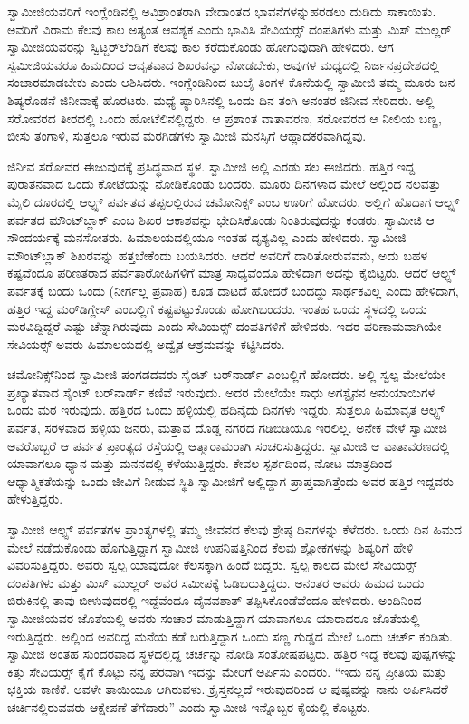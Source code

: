  ಸ್ವಾಮೀಜಿಯವರಿಗೆ ಇಂಗ್ಲೆಂಡಿನಲ್ಲಿ ಅವಿಶ್ರಾಂತರಾಗಿ ವೇದಾಂತದ ಭಾವನೆಗಳನ್ನು\break ಹರಡಲು ದುಡಿದು ಸಾಕಾಯಿತು. ಅವರಿಗೆ ವಿರಾಮ ಕೆಲವು ಕಾಲ ಅತ್ಯಂತ ಆವಶ್ಯಕ ಎಂದು ಭಾವಿಸಿ ಸೇವಿಯರ್ಸ್‍‍ ದಂಪತಿಗಳು ಮತ್ತು ಮಿಸ್ ಮುಲ್ಲರ್ ಸ್ವಾಮೀಜಿಯವರನ್ನು ಸ್ವಿಟ್ಜರ್‌ಲೆಂಡಿಗೆ ಕೆಲವು ಕಾಲ ಕರೆದುಕೊಂಡು ಹೋಗುವುದಾಗಿ ಹೇಳಿದರು. ಆಗ ಸ್ವಮೀಜಿಯವರೂ ಹಿಮದಿಂದ ಆವೃತವಾದ ಶಿಖರವನ್ನು ನೋಡಬೇಕು, ಅವುಗಳ ಮಧ್ಯದಲ್ಲಿ ನಿರ್ಜನಪ್ರದೇಶದಲ್ಲಿ ಸಂಚಾರಮಾಡಬೇಕು ಎಂದು ಆಶಿಸಿದರು. ಇಂಗ್ಲೆಂಡಿನಿಂದ ಜುಲೈ ತಿಂಗಳ ಕೊನೆಯಲ್ಲಿ ಸ್ವಾಮೀಜಿ ತಮ್ಮ ಮೂರು ಜನ ಶಿಷ್ಯರೊಡನೆ ಜಿನೀವಾಕ್ಕೆ ಹೊರಟರು. ಮಧ್ಯೆ ಪ್ಯಾರಿಸಿನಲ್ಲಿ ಒಂದು ದಿನ ತಂಗಿ ಅನಂತರ ಜಿನೀವ ಸೇರಿದರು. ಅಲ್ಲಿ ಸರೋವರದ ತೀರದಲ್ಲಿ ಒಂದು ಹೋಟೆಲಿನಲ್ಲಿದ್ದರು. ಆ ಪ್ರಶಾಂತ ವಾತಾವರಣ, ಸರೋವರದ ಆ ನೀಲಿಯ ಬಣ್ಣ, ಬೀಸು ತಂಗಾಳಿ, ಸುತ್ತಲೂ ಇರುವ ಮರಗಿಡಗಳು ಸ್ವಾಮೀಜಿ ಮನಸ್ಸಿಗೆ ಆಹ್ಲಾದಕರವಾಗಿದ್ದವು. 

 ಜಿನೀವ ಸರೋವರ ಈಜುವುದಕ್ಕೆ ಪ್ರಸಿದ್ಧವಾದ ಸ್ಥಳ. ಸ್ವಾಮೀಜಿ ಅಲ್ಲಿ ಎರಡು ಸಲ ಈಜಿದರು. ಹತ್ತಿರ ಇದ್ದ ಪುರಾತನವಾದ ಒಂದು ಕೋಟೆಯನ್ನು ನೋಡಿಕೊಂಡು ಬಂದರು. ಮೂರು ದಿನಗಳಾದ ಮೇಲೆ ಅಲ್ಲಿಂದ ನಲವತ್ತು ಮೈಲಿ ದೂರದಲ್ಲಿ ಆಲ್ಫ್ಸ್ ಪರ್ವತದ ತಪ್ಪಲಲ್ಲಿರುವ ಚಮೋನಿಕ್ಸ್ ಎಂಬ ಊರಿಗೆ ಹೋದರು. ಅಲ್ಲಿಗೆ ಹೊದಾಗ ಆಲ್ಫ್ಸ್ ಪರ್ವತದ ಮೌಂಟ್‍ಬ್ಲಾಕ್ ಎಂಬ ಶಿಖರ ಆಕಾಶವನ್ನು ಭೇದಿಸಿಕೊಂಡು ನಿಂತಿರುವುದನ್ನು ಕಂಡರು. ಸ್ವಾಮೀಜಿ ಆ ಸೌಂದರ್ಯಕ್ಕೆ ಮನಸೋತರು. ಹಿಮಾಲಯದಲ್ಲಿಯೂ ಇಂತಹ ದೃಶ್ಯವಿಲ್ಲ ಎಂದು ಹೇಳಿದರು. ಸ್ವಾಮೀಜಿ ಮೌಂಟ್‍ಬ್ಲಾಕ್ ಶಿಖರವನ್ನು ಹತ್ತಬೇಕೆಂದು ಬಯಸಿದರು. ಆದರೆ ಅವರಿಗೆ ದಾರಿತೋರುವವನು, ಅದು ಬಹಳ ಕಷ್ಟವೆಂದೂ ಪರಿಣತರಾದ ಪರ್ವತಾರೋಹಿಗಳಿಗೆ ಮಾತ್ರ ಸಾಧ್ಯವೆಂದೂ ಹೇಳಿದಾಗ ಅದನ್ನು ಕೈಬಿಟ್ಟರು. ಆದರೆ ಆಲ್ಫ್ಸ್ ಪರ್ವತಕ್ಕೆ ಬಂದು ಒಂದು (ನೀರ್ಗಲ್ಲ ಪ್ರವಾಹ) ಕೂಡ ದಾಟದೆ ಹೋದರೆ ಬಂದದ್ದು ಸಾರ್ಥಕವಿಲ್ಲ ಎಂದು ಹೇಳಿದಾಗ, ಹತ್ತಿರ ಇದ್ದ ಮರ್‌ಡಿಗ್ಲೇಸ್ ಎಂಬಲ್ಲಿಗೆ ಕಷ್ಟಪಟ್ಟುಕೊಂಡು ಹೋಗಿಬಂದರು. ಇಂತಹ ಒಂದು ಸ್ಥಳದಲ್ಲಿ ಒಂದು ಮಠವಿದ್ದಿದ್ದರೆ ಎಷ್ಟು ಚೆನ್ನಾಗಿರುವುದು ಎಂದು ಸೇವಿಯರ್ಸ್‍‍ ದಂಪತಿಗಳಿಗೆ ಹೇಳಿದರು. ಇದರ ಪರಿಣಾಮವಾಗಿಯೇ ಸೇವಿಯರ್ಸ್‍‍ ಅವರು ಹಿಮಾಲಯದಲ್ಲಿ ಅದ್ವೈತ ಆಶ್ರಮವನ್ನು ಕಟ್ಟಿಸಿದರು. 

 ಚಮೋನಿಕ್ಸ್‌ನಿಂದ ಸ್ವಾಮೀಜಿ ಪಂಗಡದವರು ಸೈಂಟ್ ಬರ್‌ನಾರ್ಡ್ ಎಂಬಲ್ಲಿಗೆ ಹೋದರು. ಅಲ್ಲಿ ಸ್ವಲ್ಪ ಮೇಲೆಯೇ ಪ್ರಖ್ಯಾತವಾದ ಸೈಂಟ್ ಬರ್‌ನಾರ್ಡ್ ಕಣಿವೆ ಇರುವುದು. ಅದರ ಮೇಲೆಯೇ ಸಾಧು ಅಗಸ್ಟೈನನ ಅನುಯಾಯಿಗಳ ಒಂದು ಮಠ ಇರುವುದು. ಹತ್ತಿರದ ಒಂದು ಹಳ್ಳಿಯಲ್ಲಿ ಹದಿನೈದು ದಿನಗಳು ಇದ್ದರು. ಸುತ್ತಲೂ ಹಿಮಾವೃತ ಆಲ್ಫ್ಸ್ ಪರ್ವತ, ಸರಳವಾದ ಹಳ್ಳಿಯ ಜನರು, ಮತ್ತಾವ ದೊಡ್ಡ ನಗರದ ಗಡಿಬಿಡಿಯೂ ಇರಲಿಲ್ಲ. ಅನೇಕ ವೇಳೆ ಸ್ವಾಮೀಜಿ ಅವರೊಬ್ಬರೆ ಆ ಪರ್ವತ ಪ್ರಾಂತ್ಯದ ರಸ್ತೆಯಲ್ಲಿ ಆತ್ಮಾರಾಮರಾಗಿ ಸಂಚರಿಸುತ್ತಿದ್ದರು. ಸ್ವಾಮೀಜಿ ಆ ವಾತಾವರಣದಲ್ಲಿ ಯಾವಾಗಲೂ ಧ್ಯಾನ ಮತ್ತು ಮನನದಲ್ಲಿ ಕಳೆಯುತ್ತಿದ್ದರು. ಕೇವಲ ಸ್ಪರ್ಶದಿಂದ, ನೋಟ ಮಾತ್ರದಿಂದ ಆಧ್ಯಾತ್ಮಿಕತೆಯನ್ನು ಒಂದು ಜೀವಿಗೆ ನೀಡುವ ಸ್ಥಿತಿ ಸ್ವಾಮೀಜಿಗೆ ಅಲ್ಲಿದ್ದಾಗ ಪ್ರಾಪ್ತವಾಗಿತ್ತೆಂದು ಅವರ ಹತ್ತಿರ ಇದ್ದವರು ಹೇಳುತ್ತಿದ್ದರು. 

 ಸ್ವಾಮೀಜಿ ಆಲ್ಫ್ಸ್ ಪರ್ವತಗಳ ಪ್ರಾಂತ್ಯಗಳಲ್ಲಿ ತಮ್ಮ ಜೀವನದ ಕೆಲವು ಶ್ರೇಷ್ಠ ದಿನಗಳನ್ನು ಕೆಳೆದರು. ಒಂದು ದಿನ ಹಿಮದ ಮೇಲೆ ನಡೆದುಕೊಂಡು ಹೊಗುತ್ತಿದ್ದಾಗ ಸ್ವಾಮೀಜಿ ಉಪನಿಷತ್ತಿನಿಂದ ಕೆಲವು ಶ್ಲೋಕಗಳನ್ನು ಶಿಷ್ಯರಿಗೆ ಹೇಳಿ ವಿವರಿಸುತ್ತಿದ್ದರು. ಅವರು ಸ್ವಲ್ಪ ಯಾವುದೋ ಕೆಲಸಕ್ಕಾಗಿ ಹಿಂದೆ ಬಿದ್ದರು. ಸ್ವಲ್ಪ ಕಾಲದ ಮೇಲೆ ಸೇವಿಯರ್ಸ್‍‍ ದಂಪತಿಗಳು ಮತ್ತು ಮಿಸ್ ಮುಲ್ಲರ್ ಅವರ ಸಮೀಪಕ್ಕೆ ಓಡಿಬರುತ್ತಿದ್ದರು. ಅನಂತರ ಅವರು ಹಿಮದ ಒಂದು ಬಿರುಕಿನಲ್ಲಿ ತಾವು ಬೀಳುವುದರಲ್ಲಿ ಇದ್ದೆವೆಂದೂ ದೈವವಶಾತ್ ತಪ್ಪಿಸಿಕೊಂಡೆವೆಂದೂ ಹೇಳಿದರು. ಅಂದಿನಿಂದ ಸ್ವಾಮೀಜಿಯವರ ಜೊತೆಯಲ್ಲಿ ಅವರು ಸಂಚಾರ ಮಾಡುತ್ತಿದ್ದಾಗ ಯಾವಾಗಲೂ ಯಾರಾದರೂ ಜೊತೆಯಲ್ಲಿ ಇರುತ್ತಿದ್ದರು. ಅಲ್ಲಿಂದ ಅವರಿದ್ದ ಮನೆಯ ಕಡೆ ಬರುತ್ತಿದ್ದಾಗ ಒಂದು ಸಣ್ಣ ಗುಡ್ಡದ ಮೇಲೆ ಒಂದು ಚರ್ಚ್ ಕಂಡಿತು. ಸ್ವಾಮೀಜಿ ಅಂತಹ ಸುಂದರವಾದ ಸ್ಥಳದಲ್ಲಿದ್ದ ಚರ್ಚನ್ನು ನೋಡಿ ಸಂತೋಷಪಟ್ಟರು. ಹತ್ತಿರ ಇದ್ದ ಕೆಲವು ಪುಷ್ಪಗಳನ್ನು ಕಿತ್ತು ಸೇವಿಯರ್ಸ್‍‍ ಕೈಗೆ ಕೊಟ್ಟು ನನ್ನ ಪರವಾಗಿ ಇದನ್ನು ಮೇರಿಗೆ ಅರ್ಪಿಸು ಎಂದರು. “ಇದು ನನ್ನ ಪ್ರೀತಿಯ ಮತ್ತು ಭಕ್ತಿಯ ಕಾಣಿಕೆ. ಅವಳೇ ತಾಯಿಯೂ ಆಗಿರುವಳು. ಕ್ರೈಸ್ತನಲ್ಲದೆ ಇರುವುದರಿಂದ ಆ ಪುಷ್ಪವನ್ನು ನಾನು ಅರ್ಪಿಸಿದರೆ ಚರ್ಚಿನಲ್ಲಿರುವವರು ಆಕ್ಷೇಪಣೆ ತೆಗೆದಾರು” ಎಂದು ಸ್ವಾಮೀಜಿ ಇನ್ನೊಬ್ಬರ ಕೈಯಲ್ಲಿ ಕೊಟ್ಟರು. 

